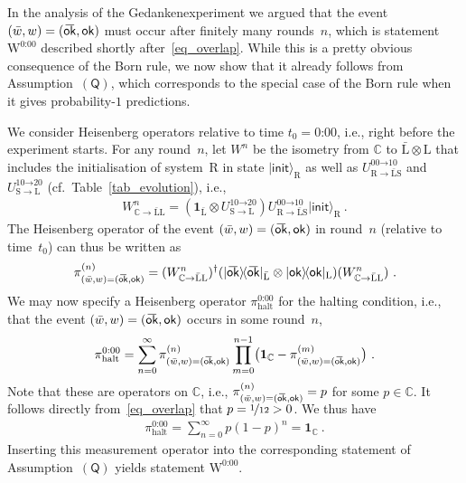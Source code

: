 \documentclass[12pt]{article}
\theoremstyle{mystyle}
\theoremstyle{definition}
\newcommand{\oline}[2]{{\mkern#2mu\overline{\protect\vphantom{t}\mkern-#2mu\smash{#1}\mkern-#2mu}\mkern#2mu}}
\newcommand*{\id}{\mathbf{1}}
\newcommand*{\ket}[1]{{| #1 \rangle}}
\newcommand{\proj}[1]{|#1\rangle\!\langle #1|}
\newcommand*{\Labone}{\mathrm{\bar{L}}}
\newcommand*{\Labtwo}{\mathrm{L}}
\newcommand*{\Wigner}{\mathrm{W}}
\newcommand*{\Spin}{\mathrm{S}}
\newcommand*{\Coin}{\mathrm{R}}
\newcommand*{\wb}{\bar{w}}
\newcommand*{\QT}{\mathsf{(Q)}}
\newcommand*{\ok}{\mathsf{ok}}
\newcommand*{\okb}{\oline{\ok}{2.8}}
\begin{document}
In the analysis of the Gedankenexperiment we argued that  the event $(\wb,w) = (\okb, \ok)$ must occur after finitely many rounds~$n$, which is statement~$\Wigner^{\text{0:00}}$ described shortly after~\eqref{eq_overlap}.  While this is a pretty obvious consequence of the Born rule, we now show that it already follows from Assumption~$\QT$, which corresponds to the special case of the Born rule when it gives probability-$1$ predictions. 

We consider Heisenberg operators relative to time $t_0=\text{0:00}$, i.e., right before the experiment starts. For any round~$n$, let $W^n$ be the isometry from $\mathbb{C}$ to $\Labone \otimes \Labtwo$ that includes the  initialisation of system~$\Coin$ in state $\ket{\mathsf{init}}_{\Coin}$ as well as $U_{\Coin \to \Labone \Spin}^{\text{00} \to \text{10}}$ and $U_{\Spin \to \Labtwo}^{\text{10} \to \text{20}}$ (cf.\ Table~\ref{tab_evolution}), i.e., 
\begin{align}
  W_{\mathbb{C} \to \Labone \Labtwo}^n =(\id_{\Labone} \otimes U_{\Spin \to \Labtwo}^{\text{10} \to \text{20}}) U_{\Coin \to \Labone \Spin}^{\text{00} \to \text{10}} \ket{\mathsf{init}}_{\Coin} \ .
\end{align}
The Heisenberg operator of the event $(\wb,w) =(\okb, \ok)$ in round~$n$ (relative to time~$t_0$) can thus be written as 
\begin{align}
  \pi^{(n)}_{(\wb,w) = (\okb, \ok)} = (W_{\mathbb{C} \to \Labone \Labtwo}^n)^{\dagger} (\proj{\okb}_{\Labone} \otimes \proj{\ok}_{\Labtwo}) (W_{\mathbb{C} \to \Labone \Labtwo}^n)  \ .
\end{align}
We may now specify a Heisenberg operator $\pi^{\text{0:00}}_{\mathrm{halt}}$ for the halting condition, i.e., that the event $(\wb, w) = (\okb,\ok)$  occurs in some round~$n$, 
\begin{align}
  \pi^{\text{0:00}}_{\mathrm{halt}} = \sum_{n=0}^\infty \pi^{(n)}_{(\wb,w)=(\okb, \ok)} \prod_{m=0}^{n-1} \bigl(\id_{\mathbb{C}}-\pi^{(m)}_{(\wb,w)=(\okb, \ok)}  \bigr) \ .
\end{align}
Note that these are operators on $\mathbb{C}$, i.e.,  $\smash{\pi^{(n)}_{(\wb,w)=(\okb, \ok)}} = p$ for some $p \in \mathbb{C}$. It follows directly from~\eqref{eq_overlap} that $p = \nicefrac{1}{12} > 0$. We thus have
\begin{align}
  \pi^{\text{0:00}}_{\mathrm{halt}} 
  = \sum_{n=0}^\infty p (1-p)^{n} = \id_{\mathbb{C}} \ .
\end{align}
Inserting this measurement operator into the corresponding statement of   Assumption~$\QT$ yields statement $\Wigner^{\text{0:00}}$.
\end{document}
